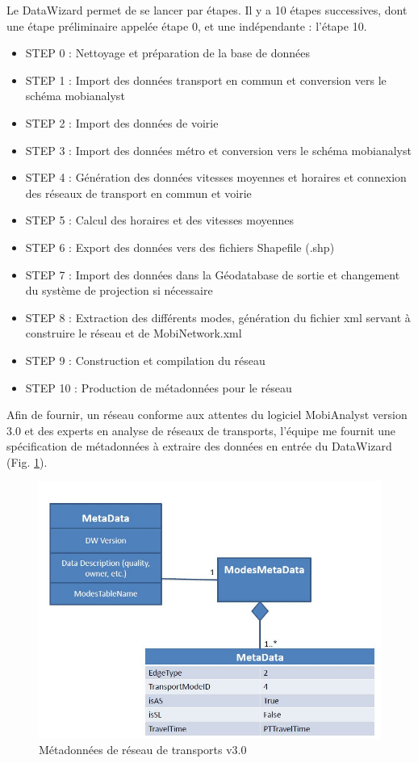 \begin{itemize}
Le DataWizard permet de se lancer par étapes. Il y a 10 étapes successives, dont une étape préliminaire appelée étape 0, et une indépendante : l'étape 10.
\begin{itemize}
\item STEP 0 : Nettoyage et préparation de la base de données
\item STEP 1 : Import des données transport en commun et conversion vers le schéma mobianalyst
\item STEP 2 : Import des données de voirie
\item STEP 3 : Import des données métro et conversion vers le schéma mobianalyst
\item STEP 4 : Génération des données vitesses moyennes et horaires et connexion des réseaux de transport en commun et voirie
\item STEP 5 : Calcul des horaires et des vitesses moyennes
\item STEP 6 : Export des données vers des fichiers Shapefile (.shp)
\item STEP 7 : Import des données dans la Géodatabase de sortie et changement du système de projection si nécessaire
\item STEP 8 : Extraction des différents modes, génération du fichier xml servant à construire le réseau et de MobiNetwork.xml
\item STEP 9 : Construction et compilation du réseau
\item STEP 10 : Production de métadonnées pour le réseau
\end{itemize}

Afin de fournir, un réseau conforme aux attentes du logiciel MobiAnalyst \og version 3.0 \fg et des experts en analyse de réseaux de transports, l'équipe me fournit une spécification de métadonnées à extraire des données en entrée du DataWizard (Fig. \ref{DW_Metadata}).\\

\begin{figure}[!h]
\centering
\includegraphics[width=12cm]{images/DW_specMetadata.JPG}
\caption{\label{DW_Metadata}Métadonnées de réseau de transports v3.0}
\end{figure} 


\end{itemize}
